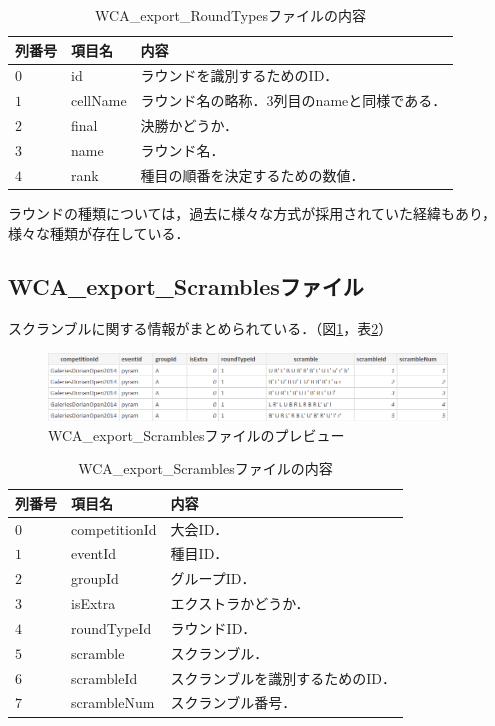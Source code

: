 \documentclass{article}
\begin{document}
  \begin{table}[h]
    \centering
    \caption{WCA\_export\_RoundTypesファイルの内容}
    \label{table:roundTypes}
    \begin{tabular}{l|l|l}
      \hline
      列番号 & 項目名 & 内容 \\
      \hline \hline
      $ 0 $ & id & ラウンドを識別するためのID． \\
      $ 1 $ & cellName & ラウンド名の略称．$ 3 $列目のnameと同様である． \\
      $ 2 $ & final & 決勝かどうか． \\
      $ 3 $ & name & ラウンド名． \\
      $ 4 $ & rank & 種目の順番を決定するための数値． \\
      \hline
    \end{tabular}
  \end{table}

  ラウンドの種類については，過去に様々な方式が採用されていた経緯もあり，様々な種類が存在している．\par

  \subsection{WCA\_export\_Scramblesファイル}

  スクランブルに関する情報がまとめられている．（図\ref{figure:scrambles}，表\ref{table:scrambles}）\par

  \begin{figure}[h]
    \centering
    \includegraphics[height=18mm]{scrambles.png}
    \caption{WCA\_export\_Scramblesファイルのプレビュー}
    \label{figure:scrambles}
  \end{figure}

  \begin{table}[h]
    \centering
    \caption{WCA\_export\_Scramblesファイルの内容}
    \label{table:scrambles}
    \begin{tabular}{l|l|l}
      \hline
      列番号 & 項目名 & 内容 \\
      \hline \hline
      $ 0 $ & competitionId & 大会ID． \\
      $ 1 $ & eventId & 種目ID． \\
      $ 2 $ & groupId & グループID． \\
      $ 3 $ & isExtra & エクストラかどうか． \\
      $ 4 $ & roundTypeId & ラウンドID． \\
      $ 5 $ & scramble & スクランブル． \\
      $ 6 $ & scrambleId & スクランブルを識別するためのID． \\
      $ 7 $ & scrambleNum & スクランブル番号． \\
      \hline
    \end{tabular}
  \end{table}
\end{document}
